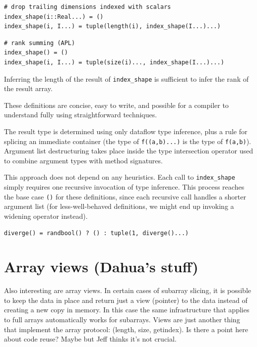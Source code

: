 \documentclass[preprint]{sigplanconf}
\begin{document}
\begin{verbatim}
# drop trailing dimensions indexed with scalars
index_shape(i::Real...) = ()
index_shape(i, I...) = tuple(length(i), index_shape(I...)...)
\end{verbatim}

\begin{verbatim}
# rank summing (APL)
index_shape() = ()
index_shape(i, I...) = tuple(size(i)..., index_shape(I...)...)
\end{verbatim}

Inferring the length of the result of \texttt{index\_shape} is sufficient
to infer the rank of the result array.

These definitions are concise, easy to write, and possible for a
compiler to understand fully using straightforward techniques.



The result type is determined using only dataflow type inference, plus a
rule for splicing an immediate container (the type of \texttt{f((a,b)...)} is
the type of \texttt{f(a,b)}). Argument list destructuring takes place inside
the type intersection operator used to combine argument types with method
signatures.

This approach does not depend on any heuristics. Each call to \texttt{index\_shape}
simply requires one recursive invocation of type inference. This process reaches
the base case \texttt{()} for these definitions, since each recursive call
handles a shorter argument list (for less-well-behaved definitions, we might
end up invoking a widening operator instead).


\begin{verbatim}
diverge() = randbool() ? () : tuple(1, diverge()...)
\end{verbatim}

\section{Array views (Dahua's stuff)}

Also interesting are array views. In certain cases of subarray slicing,
it is possible to keep the data in place and return just a view (pointer)
to the data instead of creating a new copy in memory. In this case
the same infrastructure that applies to full arrays automatically
works for subarrays. Views are just another thing that implement the
array protocol: (length, size, getindex). Is there a point here about
code reuse? Maybe but Jeff thinks it's not crucial.
\end{document}
